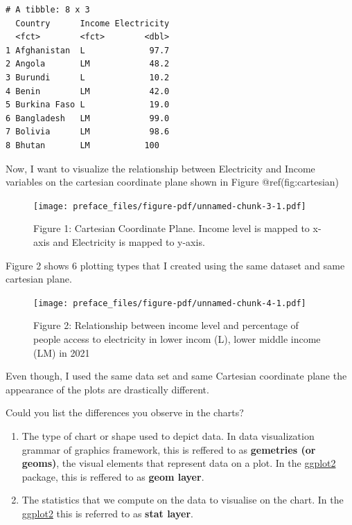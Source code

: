 \documentclass[
  letterpaper,
  DIV=11,
  numbers=noendperiod]{scrreprt}
\begin{document}
\begin{verbatim}
# A tibble: 8 x 3
  Country      Income Electricity
  <fct>        <fct>        <dbl>
1 Afghanistan  L             97.7
2 Angola       LM            48.2
3 Burundi      L             10.2
4 Benin        LM            42.0
5 Burkina Faso L             19.0
6 Bangladesh   LM            99.0
7 Bolivia      LM            98.6
8 Bhutan       LM           100  
\end{verbatim}

Now, I want to visualize the relationship between Electricity and Income
variables on the cartesian coordinate plane shown in Figure
@ref(fig:cartesian)

\begin{figure}[H]

{\centering \texttt{[image: preface\_files/figure-pdf/unnamed-chunk-3-1.pdf]}

}

\caption{Figure 1: Cartesian Coordinate Plane. Income level is mapped to
x-axis and Electricity is mapped to y-axis.}

\end{figure}%

Figure 2 shows 6 plotting types that I created using the same dataset
and same cartesian plane.

\begin{figure}[H]

{\centering \texttt{[image: preface\_files/figure-pdf/unnamed-chunk-4-1.pdf]}

}

\caption{Figure 2: Relationship between income level and percentage of
people access to electricity in lower incom (L), lower middle income
(LM) in 2021}

\end{figure}%

Even though, I used the same data set and same Cartesian coordinate
plane the appearance of the plots are drastically different.

Could you list the differences you observe in the charts?

\begin{enumerate}
\def\labelenumi{\arabic{enumi}.}
\item
  The type of chart or shape used to depict data. In data visualization
  grammar of graphics framework, this is reffered to as
  \textbf{gemetries (or geoms)}, the visual elements that represent data
  on a plot. In the \href{@ggplot2}{ggplot2} package, this is reffered
  to as \textbf{geom layer}.
\item
  The statistics that we compute on the data to visualise on the chart.
  In the \href{@ggplot2}{ggplot2} this is referred to as \textbf{stat
  layer}.
\end{enumerate}
\end{document}
